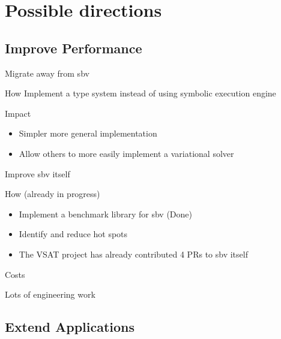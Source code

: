 \documentclass[presentation]{beamer}
\begin{document}
\section{Possible directions}
\label{sec:orgc131194}

\subsection{Improve Performance}
\label{sec:org39f7dec}

\begin{frame}[label={sec:org251f047}]{Migrate away from sbv}
\begin{block}{How}
Implement a type system instead of using symbolic execution engine
\end{block}

\begin{block}{Impact}
\begin{itemize}
\item Simpler more general implementation
\item Allow others to more easily implement a variational solver
\end{itemize}
\end{block}
\end{frame}


\begin{frame}[label={sec:org5c73560}]{Improve sbv itself}
\begin{block}{How (already in progress)}
\begin{itemize}
\item Implement a benchmark library for sbv (Done)
\item Identify and reduce hot spots
\item The VSAT project has already contributed 4 PRs to sbv itself
\end{itemize}
\end{block}
\end{frame}


\begin{frame}[label={sec:org6c3dd08}]{Costs}
\begin{block}{Lots of engineering work}
\end{block}
\end{frame}

\subsection{Extend Applications}
\label{sec:org5f44031}
\end{document}
